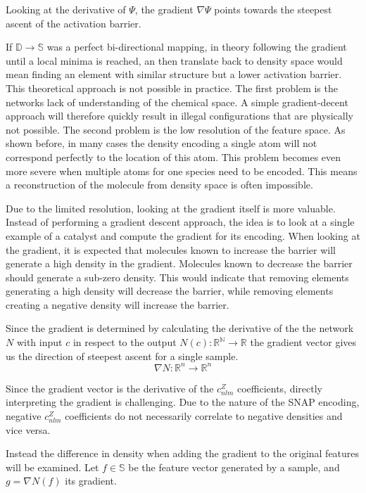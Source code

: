 Looking at the derivative of $\Psi$, the gradient $\nabla \Psi$ points towards the steepest ascent of the activation barrier.

If $\mathbb{D} \to \mathbb{S}$ was a perfect bi-directional mapping, in theory following the gradient until a local minima is reached,
an then translate back to density space would mean finding an element with similar structure but a lower activation barrier.
This theoretical approach is not possible in practice.
The first problem is the networks lack of understanding of the chemical space.
A simple gradient-decent approach will therefore quickly result in illegal configurations 
that are physically not possible.
The second problem is the low resolution of the feature space.
As shown before, in many cases the density encoding a single atom will not correspond perfectly to the location of this atom.
This problem becomes even more severe when multiple atoms for one species need to be encoded.
This means a reconstruction of the molecule from density space is often impossible.

Due to the limited resolution, looking at the gradient itself is more valuable.
Instead of performing a gradient descent approach, the idea is to look at a single example of a catalyst and compute the gradient for its encoding.
When looking at the gradient, it is expected that molecules known to increase the barrier will generate a high density in the gradient.
Molecules known to decrease the barrier should generate a sub-zero density.
This would indicate that removing elements generating a high density will decrease the barrier,
while removing elements creating a negative density will increase the barrier. %

Since the gradient is determined by calculating the derivative of the the network $N$ with input $c$ in respect to the output $N(c): \mathbb{R^N} \to \mathbb{R}$
the gradient vector gives us the direction of steepest ascent for a single sample.
$$
\nabla N: \mathbb{R}^n  \to \mathbb{R}^n 
$$

Since the gradient vector is the derivative of the $c_{nlm}^Z$ coefficients, 
directly interpreting the gradient is challenging. 
Due to the nature of the SNAP encoding, negative $c_{nlm}^Z$ coefficients do not necessarily correlate to negative densities and vice versa.

Instead the difference in density when adding the gradient to the original features will be examined.
Let $f \in \mathbb{S}$ be the feature vector generated by a sample, and $g = \nabla N(f)$ its gradient.

